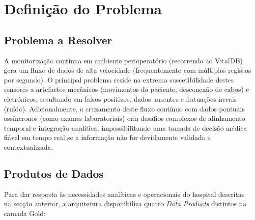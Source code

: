 \section{Definição do Problema} \label{sec:definicao_problema}

\subsection{Problema a Resolver} \label{subsec:problema_a_resolver}
A monitorização contínua em ambiente perioperatório (recorrendo ao VitalDB) gera um fluxo de dados de alta velocidade (frequentemente com múltiplos registos por segundo). O principal problema reside na extrema suscetibilidade destes sensores a artefactos mecânicos (movimentos do paciente, desconexão de cabos) e eletrónicos, resultando em falsos positivos, dados ausentes e flutuações irreais (ruído). Adicionalmente, o cruzamento deste fluxo contínuo com dados pontuais assíncronos (como exames laboratoriais) cria desafios complexos de alinhamento temporal e integração analítica, impossibilitando uma tomada de decisão médica fiável em tempo real se a informação não for devidamente validada e contextualizada.

\subsection{Produtos de Dados} \label{subsec:produtos_dados}
Para dar resposta às necessidades analíticas e operacionais do hospital descritas na secção anterior, a arquitetura disponibiliza quatro \textit{Data Products} distintos na camada Gold:

